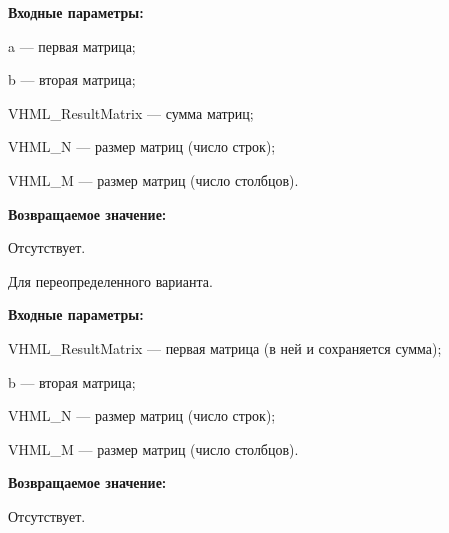\textbf{Входные параметры:}

 a --- первая матрица;
 
 b --- вторая матрица;
 
 VHML\_ResultMatrix --- сумма матриц;
 
 VHML\_N --- размер матриц (число строк);
 
 VHML\_M --- размер матриц (число столбцов).

\textbf{Возвращаемое значение:}

Отсутствует.

Для переопределенного варианта.

\textbf{Входные параметры:}

 VHML\_ResultMatrix --- первая матрица (в ней и сохраняется сумма);
 
 b --- вторая матрица;
 
 VHML\_N --- размер матриц (число строк);
 
 VHML\_M --- размер матриц (число столбцов).
 
 \textbf{Возвращаемое значение:}

Отсутствует.